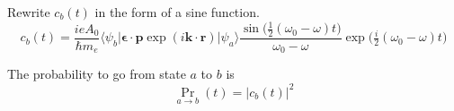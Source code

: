Rewrite $c_b(t)$ in the form of a sine function.
\begin{equation*}
c_b(t)=\frac{ieA_0}{\hbar m_e}
\langle\psi_b|\boldsymbol{\epsilon}\cdot\mathbf p\exp(i\mathbf k\cdot\mathbf r)|\psi_a\rangle
\frac{\sin\bigl(\tfrac{1}{2}(\omega_0-\omega)t\bigr)}{\omega_0-\omega}
\exp\bigl(\tfrac{i}{2}(\omega_0-\omega)t\bigr)
\tag{2}
\end{equation*}

The probability to go from state $a$ to $b$ is
\begin{equation*}
\Pr_{a\rightarrow b}(t)=|c_b(t)|^2
\end{equation*}


